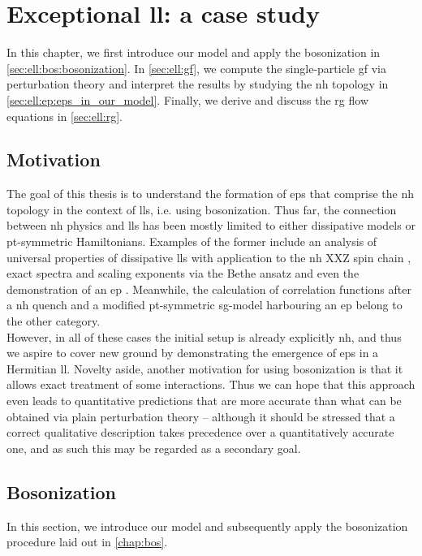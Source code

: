 \chapter{Exceptional \texorpdfstring{\acrshort{ll}}{LL}: a case study}\label{chap:ell}
In this chapter, we first introduce our model and apply the bosonization in \autoref{sec:ell:bos:bosonization}.
In \autoref{sec:ell:gf}, we compute the single-particle \gls{gf} via perturbation theory and interpret the results by studying the \gls{nh} topology in \autoref{sec:ell:ep:eps_in_our_model}.
Finally, we derive and discuss the \gls{rg} flow equations in \autoref{sec:ell:rg}.
\section{Motivation}\label{sec:ell:motivation}
The goal of this thesis is to understand the formation of \glspl{ep} that comprise the \gls{nh} topology in the context of \glspl{ll}, i.e. using bosonization.
Thus far, the connection between \gls{nh} physics and \glspl{ll} has been mostly limited to either dissipative models or \gls{pt}-symmetric Hamiltonians.
Examples of the former include an analysis of universal properties of dissipative \glspl{ll} with application to the \gls{nh} XXZ spin chain \cite{NHT_TLL_ExpVals_Yamamoto_2022}, exact spectra and scaling exponents via the Bethe ansatz \cite{NH_LL_dissipative_BetheAnsatz_Exponents_2023} and even the demonstration of an \gls{ep} \cite{NH_LL_dissipative_Lindblad_EP_Nakagawa_2021}.
Meanwhile, the calculation of correlation functions after a \gls{nh} quench \cite{NH_LL_PT_Quench_Dora_2020,NH_LL_Quenched_Correlators_Dubey_2023} and a modified \gls{pt}-symmetric \gls{sg}-model harbouring an \gls{ep} \cite{NH_LL_PT_RG_QCritical_Ashida_2017} belong to the other category.\\
However, in all of these cases the initial setup is already explicitly \gls{nh}, and thus we aspire to cover new ground by demonstrating the emergence of \glspl{ep} in a Hermitian \gls{ll}.
Novelty aside, another motivation for using bosonization is that it allows exact treatment of some interactions.
Thus we can hope that this approach even leads to quantitative predictions that are more accurate than what can be obtained via plain perturbation theory -- although it should be stressed that a correct qualitative description takes precedence over a quantitatively accurate one, and as such this may be regarded as a secondary goal.
\section{Bosonization}\label{sec:ell:bos:bosonization}
In this section, we introduce our model and subsequently apply the bosonization procedure laid out in \autoref{chap:bos}.
